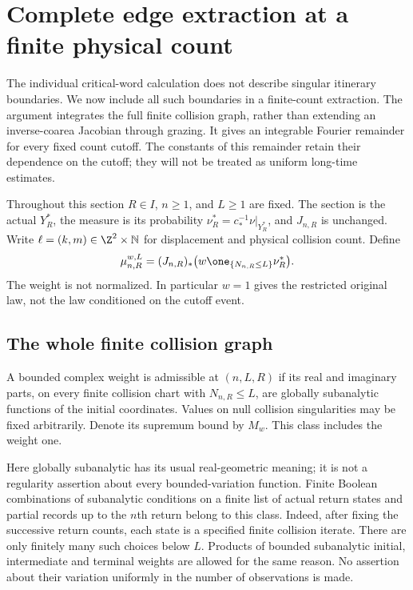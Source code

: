 \section{Complete edge extraction at a finite physical count}
\label{sec:finite-count-extraction}
The individual critical-word calculation does not describe singular
itinerary boundaries. We now include all such boundaries in a finite-count
extraction. The argument integrates the full finite collision graph,
rather than extending an inverse-coarea Jacobian through grazing.
It gives an integrable Fourier remainder for every fixed count cutoff.
The constants of this remainder retain their dependence on the cutoff;
they will not be treated as uniform long-time estimates.

Throughout this section $R\in I$, $n\ge1$, and $L\ge1$ are fixed.
The section is the actual $Y_R^*$, the measure is its probability
$\nu_R^*=c_*^{-1}\nu|_{Y_R^*}$, and $J_{n,R}$ is unchanged. Write
$\ell=(k,m)\in\Z^2\times\mathbb N$ for displacement and physical
collision count. Define
\begin{equation}\label{eq:finite-count-measure}
 \mu_{n,R}^{w,L}=(J_{n,R})_*
       \bigl(w\one_{\{N_{n,R}\le L\}}\nu_R^*\bigr).
\end{equation}
The weight is not normalized. In particular $w=1$ gives the restricted
original law, not the law conditioned on the cutoff event.

\subsection{The whole finite collision graph}
\begin{definition}
\label{def:finite-record-weight}
A bounded complex weight is admissible at $(n,L,R)$ if its real and
imaginary parts, on every finite collision chart with $N_{n,R}\le L$,
are globally subanalytic functions of the initial coordinates. Values
on null collision singularities may be fixed arbitrarily. Denote its
supremum bound by $M_w$. This class includes the weight one.
\end{definition}
Here globally subanalytic has its usual real-geometric meaning; it is
not a regularity assertion about every bounded-variation function.
Finite Boolean combinations of subanalytic conditions on a finite list
of actual return states and partial records up to the $n$th return
belong to this class.
Indeed, after fixing the successive return counts, each state is a
specified finite collision iterate. There are only finitely many such
choices below $L$. Products of bounded subanalytic initial, intermediate
and terminal weights are allowed for the same reason. No assertion
about their variation uniformly in the number of observations is made.

